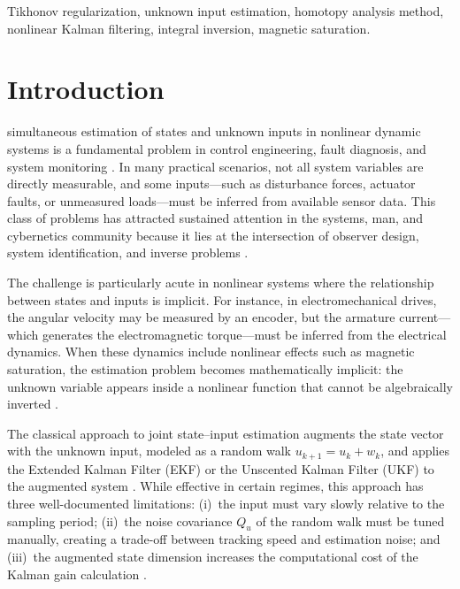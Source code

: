 \documentclass[lettersize,journal]{IEEEtran}
\begin{document}
\begin{IEEEkeywords}
Tikhonov regularization, unknown input estimation, homotopy analysis method, nonlinear Kalman filtering, integral inversion, magnetic saturation.
\end{IEEEkeywords}

\section{Introduction}
\label{sec:intro}

 simultaneous estimation of states and unknown inputs in nonlinear dynamic systems is a fundamental problem in control engineering, fault diagnosis, and system monitoring \cite{gillijns2007, hou1998}. In many practical scenarios, not all system variables are directly measurable, and some inputs---such as disturbance forces, actuator faults, or unmeasured loads---must be inferred from available sensor data. This class of problems has attracted sustained attention in the systems, man, and cybernetics community because it lies at the intersection of observer design, system identification, and inverse problems \cite{simon2006, ljung1987}.

The challenge is particularly acute in nonlinear systems where the relationship between states and inputs is implicit. For instance, in electromechanical drives, the angular velocity may be measured by an encoder, but the armature current---which generates the electromagnetic torque---must be inferred from the electrical dynamics. When these dynamics include nonlinear effects such as magnetic saturation, the estimation problem becomes mathematically implicit: the unknown variable appears inside a nonlinear function that cannot be algebraically inverted \cite{krause2013, boldea2010}.

The classical approach to joint state--input estimation augments the state vector with the unknown input, modeled as a random walk $u_{k+1} = u_k + w_k$, and applies the Extended Kalman Filter (EKF) or the Unscented Kalman Filter (UKF) to the augmented system \cite{kitanidis1987, gillijns2007, fang2012}. While effective in certain regimes, this approach has three well-documented limitations: (i)~the input must vary slowly relative to the sampling period; (ii)~the noise covariance $Q_u$ of the random walk must be tuned manually, creating a trade-off between tracking speed and estimation noise; and (iii)~the augmented state dimension increases the computational cost of the Kalman gain calculation \cite{hsieh2000, yong2016}.
\end{document}
